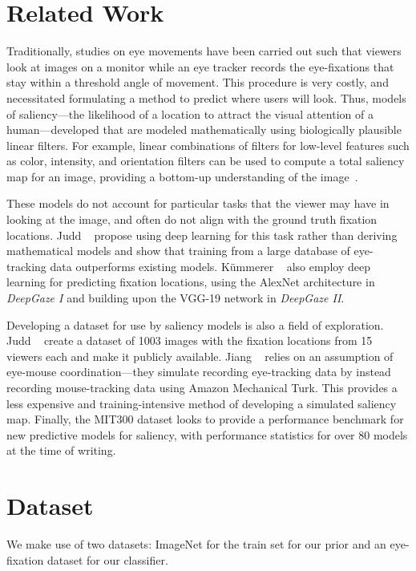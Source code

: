 \documentclass[10pt,twocolumn,letterpaper]{article}
\begin{document}
\section{Related Work} 

Traditionally, studies on eye movements have been carried out such that
viewers look at images on a monitor while an eye tracker records the
eye-fixations that stay within a threshold angle of movement. This procedure is
very costly, and necessitated formulating a method to predict where users will
look. Thus, models of saliency---the likelihood of a location to attract the
visual attention of a human---developed that are modeled mathematically using
biologically plausible linear filters. For example, linear combinations of
filters for low-level features such as color, intensity, and orientation
filters can be used to compute a total saliency map for an image,
providing a bottom-up understanding of the image~\cite{Itti}.

These models do not account for particular tasks that the viewer may have in
looking at the image, and often do not align with the ground truth fixation
locations. Judd \etal~\cite{Judd} propose using deep learning for this task
rather than deriving mathematical models and show that training from a large
database of eye-tracking data outperforms existing models. K\"ummerer
\etal~\cite{Kummerer} also employ deep learning for predicting fixation
locations, using the AlexNet architecture in \textit{DeepGaze I} and building
upon the VGG-19 network in \textit{DeepGaze II}.

Developing a dataset for use by saliency models is also a field of exploration.
Judd \etal~\cite{Judd} create a dataset of 1003 images with the fixation
locations from 15 viewers each and make it publicly available. Jiang
\etal~\cite{Jiang} relies on an assumption of eye-mouse coordination---they
simulate recording eye-tracking data by instead recording mouse-tracking data
using Amazon Mechanical Turk. This provides a less expensive and
training-intensive method of developing a simulated saliency map. Finally, the
MIT300 dataset \cite{mitbench} looks to provide a performance benchmark for new predictive
models for saliency, with performance statistics for over 80 models at the time
of writing. 


\section{Dataset}
We make use of two datasets: ImageNet \cite{imagenet} for the train set for our prior and an
eye-fixation dataset for our classifier. 
\end{document}
